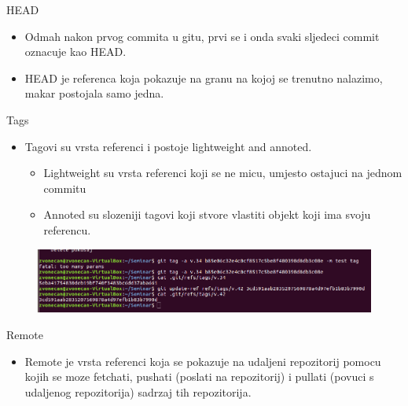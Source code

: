 \documentclass[]{beamer}
\begin{document}
\begin{frame}{HEAD}
	\begin{itemize}
	\item Odmah nakon prvog commita u gitu, prvi se i onda svaki sljedeci commit oznacuje kao HEAD.
	\item HEAD je referenca koja pokazuje na granu na kojoj se trenutno nalazimo, makar postojala samo jedna.
	\end{itemize}
\end{frame}
\begin{frame}{Tags}
	\begin{itemize}
	\item Tagovi su vrsta referenci i postoje lightweight and annoted.
	\begin{itemize}
	\item Lightweight su vrsta referenci koji se ne micu, umjesto ostajuci na jednom commitu
	\item Annoted su slozeniji tagovi koji stvore vlastiti objekt koji ima svoju referencu.
	\end{itemize}
	\end{itemize}
\end{frame}
\begin{frame}
	\begin{figure}
	\includegraphics[width=1\textwidth]{./slike/tag.png}
	\end{figure}
\end{frame}
\begin{frame}{Remote}
	\begin{itemize}
	\item Remote je vrsta referenci koja se pokazuje na udaljeni repozitorij pomocu kojih se moze fetchati, pushati (poslati na repozitorij) i pullati (povuci s udaljenog repozitorija) sadrzaj tih repozitorija.  
	\end{itemize}
\end{frame}
\end{document}

